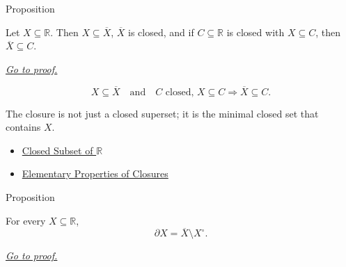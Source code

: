 \begin{propositionbox}{Proposition}
\begin{proposition}
\label{prop:closure-is-smallest-closed-superset}
Let \(X\subseteq\mathbb{R}\).  Then \(X\subseteq\overline{X}\),
\(\overline{X}\) is closed, and if \(C\subseteq\mathbb{R}\) is closed with
\(X\subseteq C\), then \(\overline{X}\subseteq C\).

\smallskip\noindent
\hyperref[prf:closure-is-smallest-closed-superset]{\textit{Go to proof.}}
\end{proposition}
\end{propositionbox}

\begin{remark*}
\[
  X\subseteq\overline{X}
  \quad\text{and}\quad
  C\text{ closed},\,X\subseteq C\Rightarrow \overline{X}\subseteq C.
\]
\end{remark*}

\begin{remark*}[Interpretation]
The closure is not just a closed superset; it is the minimal closed set that
contains \(X\).
\end{remark*}

\begin{dependencies}
\begin{itemize}
  \item \hyperref[def:closed-set-r]{Closed Subset of \(\mathbb{R}\)}
  \item \hyperref[lem:closure-elementary]{Elementary Properties of Closures}
\end{itemize}
\end{dependencies}

\begin{propositionbox}{Proposition}
\begin{proposition}
\label{prop:boundary-as-closure-minus-interior}
For every \(X\subseteq\mathbb{R}\),
\[
  \partial X=\overline{X}\setminus X^\circ.
\]

\smallskip\noindent
\hyperref[prf:boundary-as-closure-minus-interior]{\textit{Go to proof.}}
\end{proposition}
\end{propositionbox}

